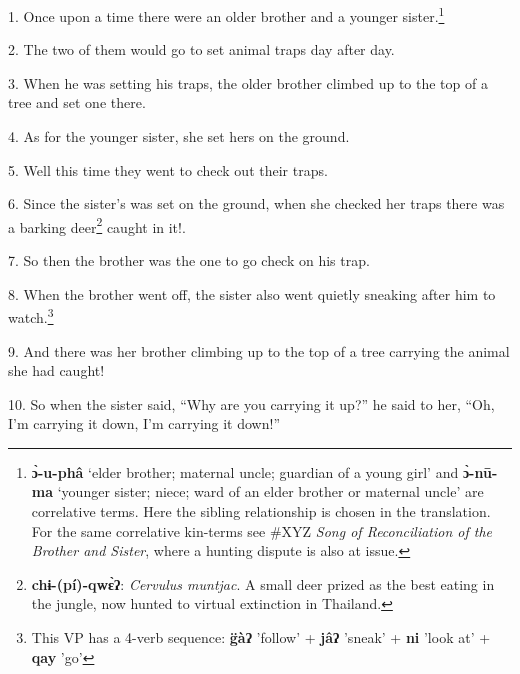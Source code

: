 \setcounter{footnote}{0}

1. Once upon a time there were an older brother and a younger sister.\footnote{\textbf{ɔ̀-u-phâ} `elder brother; maternal uncle; guardian of a young girl' and \textbf{ɔ̀-nū-ma} `younger sister; niece; ward of an elder brother or maternal uncle' are correlative terms. Here the sibling relationship is chosen in the translation. For the same correlative kin-terms see \#XYZ \textit{Song of Reconciliation of the Brother and Sister}, where a hunting dispute is also at issue.}

2. The two of them would go to set animal traps day after day.

3. When he was setting his traps, the older brother climbed up to the top of a
tree and set one there.

4. As for the younger sister, she set hers on the ground.

5. Well this time they went to check out their traps.

6. Since the sister's was set on the ground, when she checked her traps there was
a barking deer\footnote{\textbf{chɨ-(pí)-qwɛ̀ʔ}: \textit{Cervulus muntjac}. A small deer prized as the best eating in the jungle, now hunted to virtual extinction in Thailand.} caught in it!.

7. So then the brother was the one to go check on his trap.

8. When the brother went off, the sister also went quietly sneaking after him to
watch.\footnote{This VP has a 4-verb sequence: \textbf{g̈àʔ} 'follow' + \textbf{jâʔ} 'sneak' + \textbf{ni} 'look at' + \textbf{qay} 'go'}

9. And there was her brother climbing up to the top of a tree carrying the animal
she had caught!

10. So when the sister said, ``Why are you carrying it up?'' he said to her, ``Oh,
I'm carrying it down, I'm carrying it down!''

